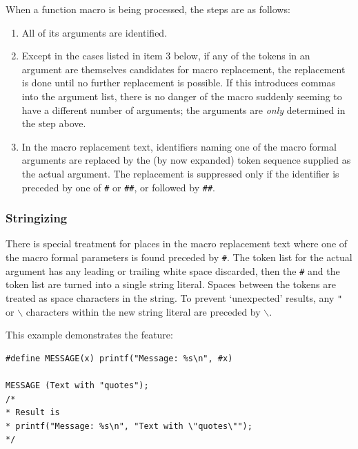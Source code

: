     When a function macro is being processed, the steps are as
     follows:


    \begin{enumerate}
     \item All of its arguments are identified.

     \item Except in the cases listed in item 3 below, if any of the tokens in
      an argument are themselves candidates for macro replacement, the
      replacement is done until no further replacement is possible. If
      this introduces commas into the argument list, there is no danger
      of the macro suddenly seeming to have a different number of
      arguments; the arguments are \textit{only} determined in the step
      above.

     \item In the macro replacement text, identifiers naming one of the macro
      formal arguments are replaced by the (by now expanded) token
      sequence supplied as the actual argument. The replacement is
      suppressed only if the identifier is preceded by one
      of \texttt{\#} or \texttt{\#\#}, or followed
      by \texttt{\#\#}.
    \end{enumerate}

   

   \subsubsection{Stringizing}
    

    There is special treatment for places in the macro replacement text
     where one of the macro formal parameters is found preceded by
     \texttt{\#}. The token list for the actual argument has any leading
     or trailing white space discarded, then the \texttt{\#} and the
     token list are turned into a single string literal. Spaces between the
     tokens are treated as space characters in the string. To prevent
     `unexpected' results, any \texttt{"}
     or \texttt{$\backslash$} characters within the new string literal are
     preceded by \texttt{$\backslash$}.


    This example demonstrates the feature:


    \begin{Verbatim}
#define MESSAGE(x) printf("Message: %s\n", #x)

MESSAGE (Text with "quotes");
/*
* Result is
* printf("Message: %s\n", "Text with \"quotes\"");
*/
\end{Verbatim}

